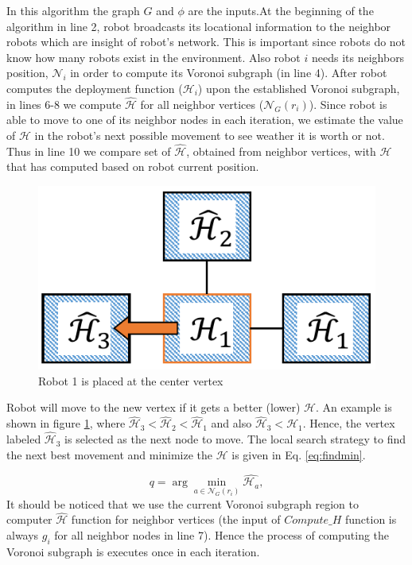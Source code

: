 \documentclass[twocolumn]{svjour3}       %
\begin{document}
In this algorithm the graph $G$ and $\phi$ are the inputs.At the beginning of the algorithm in line 2, robot broadcasts its locational information to the neighbor robots which are insight of robot's network. This is important since robots do not know how many robots exist in the environment. Also robot $i$ needs its neighbors position, $\mathcal N_i$ in order to compute its Voronoi subgraph (in line 4). After robot computes the deployment function ($\mathcal{H}_i$) upon the established Voronoi subgraph, in lines 6-8 we compute $\hat{\mathcal{H}}$ for all neighbor vertices ($\mathcal{N}_G(r_i)$). 
%
Since robot is able to move to one of its neighbor nodes in each iteration, we estimate the value of $\mathcal{H}$ in the robot's next possible movement to see weather it is worth or not. Thus in line 10 we compare set of $\hat{\mathcal{H}}$, obtained from neighbor vertices, with $\mathcal{H}$ that has computed based on robot current position. 
%

\begin{figure}
\centering
\includegraphics[width=0.35\columnwidth]{Figures/Neighbors.pdf}
\caption{Robot 1 is placed at the center vertex }
\label{fig:neighbors}
\end{figure}

Robot will move to the new vertex if it gets a better (lower) $\mathcal H$. An example is shown in figure \ref{fig:neighbors}, where $\hat{\mathcal{H}}_3<\hat{\mathcal{H}}_2<\hat{\mathcal{H}}_1$ and also $\hat{\mathcal{H}}_3< {\mathcal{H}}_1$. Hence, the vertex labeled $\hat{\mathcal{H}}_3$ is selected as the next node to move. The local search strategy to find the next best movement and minimize the $\mathcal{H}$ is given in Eq. \ref{eq:findmin}.

\begin{equation}
\label{eq:findmin}
q=\arg\min_{a\in \mathcal{N}_G(r_i)} \hat{\mathcal{H}_a},  
\end{equation}
%
It should be noticed that we use the current Voronoi subgraph region to computer $\hat{\mathcal{H}}$ function for neighbor vertices (the input of $Compute\_H$ function is always $g_i$ for all neighbor nodes in line 7). Hence the process of computing the Voronoi subgraph is executes once in each iteration.
\end{document}

